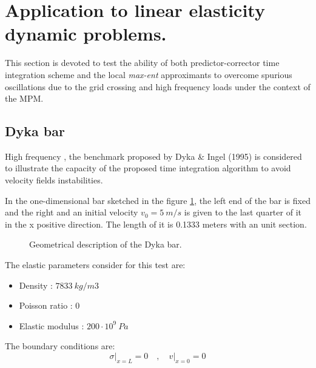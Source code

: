 
\section{Application to linear elasticity dynamic problems.}
\label{sec:Application-linear-elasticity-dynamic-problems}

This section is devoted to test the ability of both predictor-corrector
time integration scheme and the local \textit{max-ent} approximants to
overcome spurious oscillations due to the grid crossing and high
frequency loads under the context of the MPM.

\subsection{Dyka bar}
\label{sec:dyka-bar}

High frequency , the benchmark proposed by Dyka \& Ingel
(1995)\cite{Dyka1995} is considered to illustrate the
capacity of the proposed time integration algorithm to avoid velocity
fields instabilities.

In the one-dimensional bar sketched in the figure \ref{fig:Dyka_Bar},
the left end of the bar is fixed and the right and an initial velocity
$v_0 = 5\ m/s$ is given to the last quarter of it in the x positive
direction. The length of it is 0.1333 meters with an unit section.

\begin{figure}\sidecaption
  \centering
  \resizebox{\hsize}{!}{
    }
  \caption{Geometrical description of the Dyka \cite{Dyka1995} bar.}
  \label{fig:Dyka_Bar}
\end{figure}

The elastic parameters consider for this test are:
\begin{itemize} 
\item  Density : $7833\ kg/m3$
\item  Poisson ratio : $0$
\item  Elastic modulus : $200 \cdot 10^9\ Pa$
\end{itemize}

The boundary conditions are:
\begin{equation}
  \label{eq:3}
  \sigma \rvert_{x=L} = 0 \quad , \quad v \rvert_{x=0} = 0
\end{equation}

